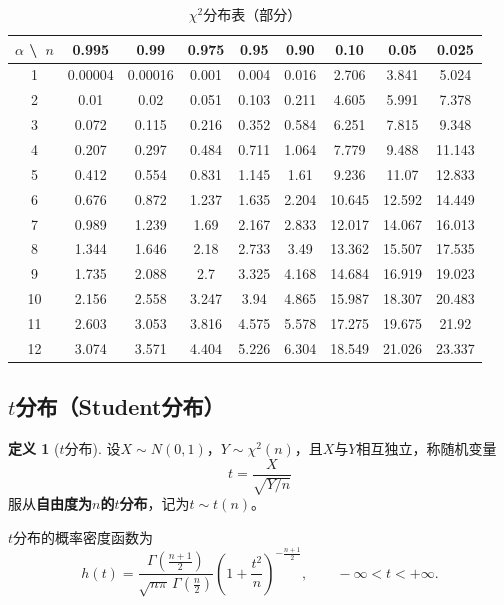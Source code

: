 \documentclass[11pt,a4paper]{report}
\theoremstyle{definition}
\newtheorem{definition}{定义}[chapter]
\begin{document}
\begin{table}[htbp]
\centering
\caption{$\chi^{2}$分布表（部分）}
\begin{tabular}{@{}ccccccccc@{}}
\toprule
$\alpha$ \textbackslash\ $n$ & 0.995 & 0.99 & 0.975 & 0.95 & 0.90 & 0.10 & 0.05 & 0.025 \\
\midrule
1 & 0.00004 & 0.00016 & 0.001 & 0.004 & 0.016 & 2.706 & 3.841 & 5.024 \\
2 & 0.01 & 0.02 & 0.051 & 0.103 & 0.211 & 4.605 & 5.991 & 7.378 \\
3 & 0.072 & 0.115 & 0.216 & 0.352 & 0.584 & 6.251 & 7.815 & 9.348 \\
4 & 0.207 & 0.297 & 0.484 & 0.711 & 1.064 & 7.779 & 9.488 & 11.143 \\
5 & 0.412 & 0.554 & 0.831 & 1.145 & 1.61 & 9.236 & 11.07 & 12.833 \\
6 & 0.676 & 0.872 & 1.237 & 1.635 & 2.204 & 10.645 & 12.592 & 14.449 \\
7 & 0.989 & 1.239 & 1.69 & 2.167 & 2.833 & 12.017 & 14.067 & 16.013 \\
8 & 1.344 & 1.646 & 2.18 & 2.733 & 3.49 & 13.362 & 15.507 & 17.535 \\
9 & 1.735 & 2.088 & 2.7 & 3.325 & 4.168 & 14.684 & 16.919 & 19.023 \\
10 & 2.156 & 2.558 & 3.247 & 3.94 & 4.865 & 15.987 & 18.307 & 20.483 \\
11 & 2.603 & 3.053 & 3.816 & 4.575 & 5.578 & 17.275 & 19.675 & 21.92 \\
12 & 3.074 & 3.571 & 4.404 & 5.226 & 6.304 & 18.549 & 21.026 & 23.337 \\
\bottomrule
\end{tabular}
\end{table}

\subsection{\texorpdfstring{$t$}{t}分布（Student分布）}

\begin{definition}[$t$分布]
设$X\sim N(0,1)$，$Y\sim\chi^{2}(n)$，且$X$与$Y$相互独立，称随机变量
\[
t=\frac{X}{\sqrt{Y/n}}
\]
服从\textbf{自由度为$n$的$t$分布}，记为$t\sim t(n)$。

$t$分布的概率密度函数为
\[
h(t)=\frac{\Gamma\left(\frac{n+1}{2}\right)}{\sqrt{n\pi}\,\Gamma\left(\frac{n}{2}\right)}\left(1+\frac{t^{2}}{n}\right)^{-\frac{n+1}{2}},\qquad -\infty<t<+\infty.
\]
\end{definition}
\end{document}
